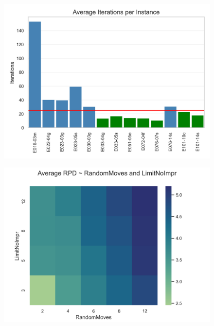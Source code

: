 \begin{figure}[ht]
    \centering
    \begin{minipage}[t]{0.49\textwidth}
        \centering
        \includegraphics[width=\linewidth]{pictures/iterations_per_instance.png}
        \label{fig:average_iterations_noclassifier}
    \end{minipage}\hfill
    \begin{minipage}[t]{0.49\textwidth}
        \centering
        \includegraphics[width=\linewidth]{pictures/heatmap_randomMoves_limitNoImpr.png}
        \label{fig:heatmap_parameter_study}
    \end{minipage}
\end{figure}

